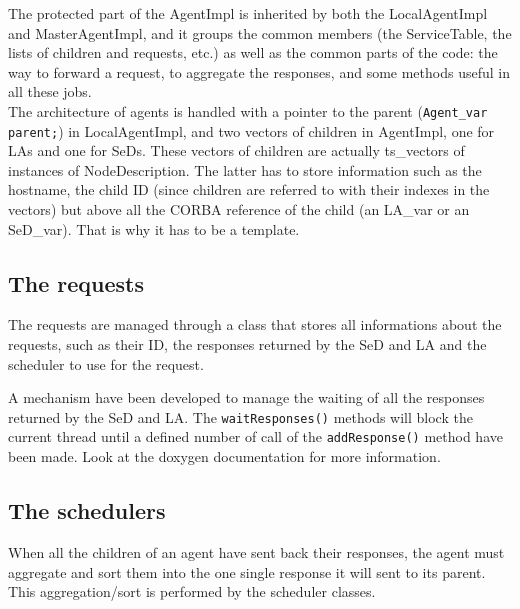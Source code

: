   The protected part of the \textsf{AgentImpl} is inherited by both the
  \textsf{LocalAgentImpl} and \textsf{MasterAgentImpl}, and it groups the common
  members (the \textsf{ServiceTable}, the lists of children and requests, etc.) as
  well as the common parts of the code: the way to forward a request, to aggregate
  the responses, and some methods useful in all these jobs.
  \\

  The architecture of agents is handled with a pointer to the parent
  (\verb+Agent_var parent;+) in \textsf{LocalAgentImpl}, and two vectors of children
  in \textsf{AgentImpl}, one for LAs and one for SeDs. These vectors of children are
  actually \textsf{ts\_vectors} of instances of \textsf{NodeDescription}. The
  latter has to store information such as the hostname, the child ID (since
      children are referred to with their indexes in the vectors) but above all the
  CORBA reference of the child (an \textsf{LA\_var} or an \textsf{SeD\_var}). That
  is why it has to be a template.


  \subsection{The requests}

  The requests are managed through a class that stores all informations
  about the requests, such as their ID, the responses returned by the SeD and LA
  and the scheduler to use for the request.

  A mechanism have been developed to manage the waiting of all the responses
  returned by the SeD and LA. The \texttt{waitResponses()} methods will block the
  current thread until a defined number of call of the \texttt{addResponse()}
  method have been made. Look at the doxygen documentation for more information.


  \subsection{The schedulers}

  When all the children of an agent have sent back their responses, the agent must
  aggregate and sort them into the one single response it will sent to its parent.
  This aggregation/sort is performed by the scheduler classes.

